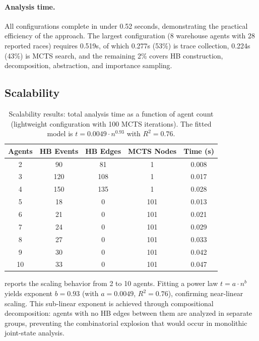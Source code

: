 \documentclass[11pt]{article}
\begin{document}
\paragraph{Analysis time.}
All configurations complete in under 0.52 seconds, demonstrating the
practical efficiency of the approach. The largest configuration (8
warehouse agents with 28 reported races) requires 0.519s, of which
0.277s (53\%) is trace collection, 0.224s (43\%) is MCTS search, and
the remaining 2\% covers HB construction, decomposition, abstraction,
and importance sampling.

\subsection{Scalability}

\begin{table}[t]
\centering
\caption{Scalability results: total analysis time as a function of
agent count (lightweight configuration with 100 MCTS iterations).
The fitted model is $t = 0.0049 \cdot n^{0.93}$ with $R^2 = 0.76$.}
\label{tab:scalability}
\begin{tabular}{@{}ccccc@{}}
\toprule
\textbf{Agents} & \textbf{HB Events} & \textbf{HB Edges} & \textbf{MCTS Nodes} & \textbf{Time (s)} \\
\midrule
2  & 90  & 81  & 1   & 0.008 \\
3  & 120 & 108 & 1   & 0.017 \\
4  & 150 & 135 & 1   & 0.028 \\
5  & 18  & 0   & 101 & 0.013 \\
6  & 21  & 0   & 101 & 0.021 \\
7  & 24  & 0   & 101 & 0.029 \\
8  & 27  & 0   & 101 & 0.033 \\
9  & 30  & 0   & 101 & 0.042 \\
10 & 33  & 0   & 101 & 0.047 \\
\bottomrule
\end{tabular}
\end{table}

 reports the scaling behavior from 2 to 10 agents.
Fitting a power law $t = a \cdot n^b$ yields exponent $b = 0.93$ (with
$a = 0.0049$, $R^2 = 0.76$), confirming near-linear scaling. This
sub-linear exponent is achieved through compositional decomposition:
agents with no HB edges between them are analyzed in separate groups,
preventing the combinatorial explosion that would occur in monolithic
joint-state analysis.
\end{document}
